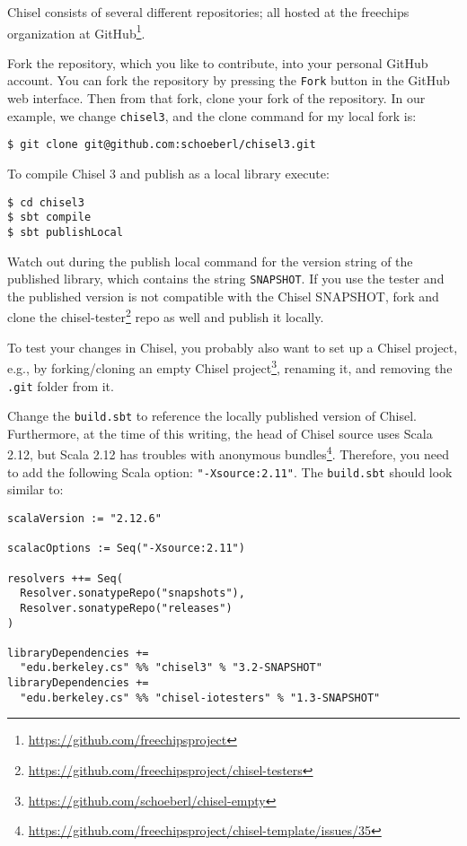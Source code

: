 \documentclass[%
    10pt,
    headinclude, footexclude,
    openright, %
    notitlepage,
    cleardoubleempty,
    headsepline,
    pointlessnumbers,
    bibtotoc, idxtotoc,
    ]{scrbook}
\newcommand{\code}[1]{{\small{\texttt{#1}}}}
\newcommand{\myref}[2]{\href{#1}{#2}}
\renewcommand{\myref}[2]{{#2}{\footnote{\url{#1}}}}
\begin{document}
Chisel consists of several different repositories; all hosted at
the \myref{https://github.com/freechipsproject}{freechips organization at GitHub}.

Fork the repository, which you like to contribute, into your personal GitHub account.
You can fork the repository by pressing the \code{Fork} button in the GitHub web interface.
Then from that fork, clone your fork of the repository. In our example, we change
\code{chisel3}, and the clone command for my local fork is:

\begin{verbatim}
$ git clone git@github.com:schoeberl/chisel3.git
\end{verbatim}

To compile Chisel 3 and publish as a local library execute:
\begin{verbatim}
$ cd chisel3
$ sbt compile
$ sbt publishLocal
\end{verbatim}

Watch out during the publish local command for the version string of the published
library, which contains the string \code{SNAPSHOT}.
If you use the tester and the published version is not compatible with the Chisel
SNAPSHOT, fork and clone the \myref{https://github.com/freechipsproject/chisel-testers}{chisel-tester}
repo as well and publish it locally.

To test your changes in Chisel, you probably also want to set up a Chisel project,
e.g., by forking/cloning an \myref{https://github.com/schoeberl/chisel-empty}{empty Chisel project},
renaming it, and removing the \code{.git} folder from it.

Change the \code{build.sbt} to reference the locally published version of Chisel.
Furthermore, at the time of this writing, the head of Chisel source uses Scala 2.12, but Scala
2.12 has troubles with
\myref{https://github.com/freechipsproject/chisel-template/issues/35}{anonymous bundles}.
Therefore, you need to add the following Scala option: \code{"-Xsource:2.11"}.
The \code{build.sbt} should look similar to:

\begin{verbatim}
scalaVersion := "2.12.6"

scalacOptions := Seq("-Xsource:2.11")

resolvers ++= Seq(
  Resolver.sonatypeRepo("snapshots"),
  Resolver.sonatypeRepo("releases")
)

libraryDependencies +=
  "edu.berkeley.cs" %% "chisel3" % "3.2-SNAPSHOT"
libraryDependencies +=
  "edu.berkeley.cs" %% "chisel-iotesters" % "1.3-SNAPSHOT"
\end{verbatim}
\end{document}
